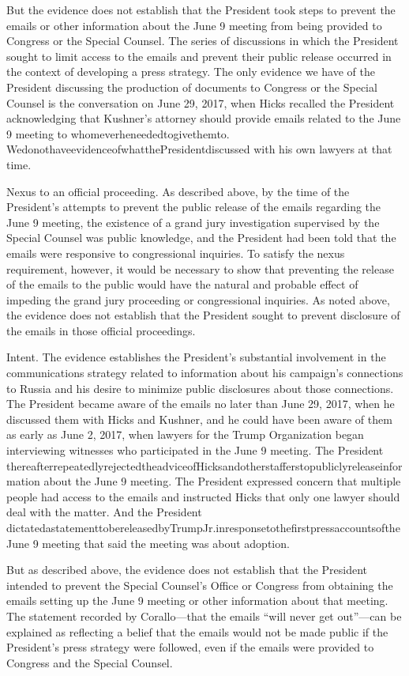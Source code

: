 But the evidence does not establish that the President took steps to prevent the emails or other information about the June 9 meeting from being provided to Congress or the Special Counsel.
The series of discussions in which the President sought to limit access to the emails and prevent their public release occurred in the context of developing a press strategy.
The only evidence we have of the President discussing the production of documents to Congress or the Special Counsel is the conversation on June 29, 2017, when Hicks recalled the President acknowledging that Kushner's attorney should provide emails related to the June 9 meeting to whomeverheneededtogivethemto.
WedonothaveevidenceofwhatthePresidentdiscussed with his own lawyers at that time.

Nexus to an official proceeding.
As described above, by the time of the President's attempts to prevent the public release of the emails regarding the June 9 meeting, the existence of a grand jury investigation supervised by the Special Counsel was public knowledge, and the President had been told that the emails were responsive to congressional inquiries.
To satisfy the nexus requirement, however, it would be necessary to show that preventing the release of the emails to the public would have the natural and probable effect of impeding the grand jury proceeding or congressional inquiries.
As noted above, the evidence does not establish that the President sought to prevent disclosure of the emails in those official proceedings.

Intent.
The evidence establishes the President's substantial involvement in the communications strategy related to information about his campaign's connections to Russia and his desire to minimize public disclosures about those connections.
The President became aware of the emails no later than June 29, 2017, when he discussed them with Hicks and Kushner, and he could have been aware of them as early as June 2, 2017, when lawyers for the Trump Organization began interviewing witnesses who participated in the June 9 meeting.
The President thereafterrepeatedlyrejectedtheadviceofHicksandotherstafferstopubliclyreleaseinformation about the June 9 meeting.
The President expressed concern that multiple people had access to the emails and instructed Hicks that only one lawyer should deal with the matter.
And the President dictatedastatementtobereleasedbyTrumpJr.inresponsetothefirstpressaccountsoftheJune 9 meeting that said the meeting was about adoption.

But as described above, the evidence does not establish that the President intended to prevent the Special Counsel's Office or Congress from obtaining the emails setting up the June 9 meeting or other information about that meeting.
The statement recorded by Corallo—that the emails “will never get out”—can be explained as reflecting a belief that the emails would not be made public if the President's press strategy were followed, even if the emails were provided to Congress and the Special Counsel.

